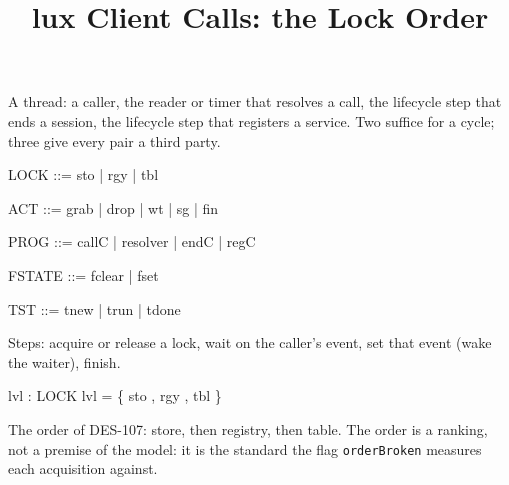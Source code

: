 \documentclass[a4paper,10pt,fleqn]{article}
\begin{document}
\title{lux Client Calls: the Lock Order}
\maketitle

\begin{zed}
  [T]
\end{zed}

A thread: a caller, the reader or timer that resolves a call, the lifecycle
step that ends a session, the lifecycle step that registers a service.  Two
suffice for a cycle; three give every pair a third party.

\begin{zed}
  LOCK ::= sto | rgy | tbl
\end{zed}

\begin{zed}
  ACT ::= grab | drop | wt | sg | fin
\end{zed}

\begin{zed}
  PROG ::= callC | resolver | endC | regC
\end{zed}

\begin{zed}
  FSTATE ::= fclear | fset
\end{zed}

\begin{zed}
  TST ::= tnew | trun | tdone
\end{zed}

Steps: acquire or release a lock, wait on the caller's event, set that event
(wake the waiter), finish.

\begin{axdef}
  lvl : LOCK  
\where
  lvl = \{ sto , rgy , tbl  \}
\end{axdef}

The order of DES-107: store, then registry, then table.  The order is a
ranking, not a premise of the model: it is the standard the flag
\texttt{orderBroken} measures each acquisition against.
\end{document}
